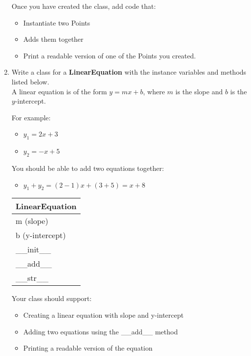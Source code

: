 \documentclass{article}
\begin{document}
\begin{enumerate}
		Once you have created the class, add code that:
		\begin{itemize}
			\item Instantiate two Points
			\item Adds them together
			\item Print a readable version of one of the Points you created.
		\end{itemize}



	\item
		Write a class for a \textbf{LinearEquation} with the instance variables and methods listed 
		below.\\ A linear equation is of the form $y = mx + b$, where $m$ is the slope and $b$ is 
		the $y$-intercept.

		\begin{minipage}[t]{0.65\textwidth}
				For example:
			\begin{itemize}
				\item $y_1 = 2x + 3$
				\item $y_2 = -x + 5$
			\end{itemize}
			You should be able to add two equations together:
			\begin{itemize}
				\item $y_1 + y_2 = (2 - 1)x + (3 + 5) = x + 8$
			\end{itemize}
		\end{minipage}
		\hfill
		\begin{minipage}[t]{0.32\textwidth}
			\vspace{0.2em}
			\begin{flushright}
				\begin{tabular}{|l|}
					\hline
					LinearEquation \\ \hline
					m (slope) \\
					b (y-intercept) \\ \hline
					\_\_init\_\_ \\
					\_\_add\_\_ \\
					\_\_str\_\_ \\ \hline
				\end{tabular}
			\end{flushright}
		\end{minipage}
		
		Your class should support:
		\begin{itemize}
			\item Creating a linear equation with slope and y-intercept
			\item Adding two equations using the \_\_add\_\_ method
			\item Printing a readable version of the equation
		\end{itemize}
		

\end{enumerate}
\end{document}
